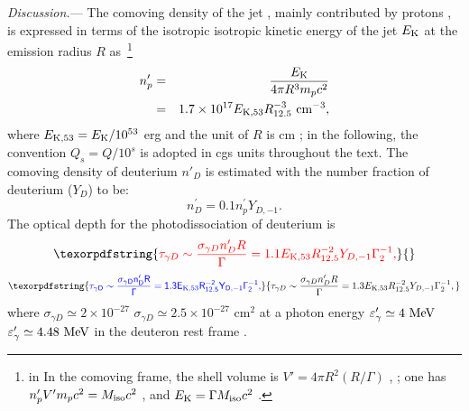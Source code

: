 \documentclass[linenumbers,twocolumn]{aastex631}
\providecommand{\DIFaddtex}[1]{{\protect\color{blue} \sf #1}} %
\providecommand{\DIFdeltex}[1]{{\protect\color{red} \scriptsize #1}} %
\providecommand{\DIFaddbegin}{} %
\providecommand{\DIFaddend}{} %
\providecommand{\DIFdelbegin}{} %
\providecommand{\DIFdelend}{} %
\providecommand{\DIFadd}[1]{\texorpdfstring{\DIFaddtex{#1}}{#1}} %
\providecommand{\DIFdel}[1]{\texorpdfstring{\DIFdeltex{#1}}{}} %
\begin{document}
\textit{Discussion.}--- The comoving density of the jet\DIFaddbegin \DIFadd{, }\DIFaddend mainly contributed by protons\DIFaddbegin \DIFadd{, }\DIFaddend is expressed in terms of the isotropic \DIFdelbegin \DIFdel{isotropic }\DIFdelend kinetic energy of the jet $E_{\rm K}$ at the emission radius $R$ as~\footnote{\DIFdelbegin \DIFdel{in }\DIFdelend \DIFaddbegin \DIFadd{In }\DIFaddend the comoving frame, the shell volume is $V'=4\pi R^2 (R/\Gamma)$\DIFdelbegin \DIFdel{, }\DIFdelend \DIFaddbegin \DIFadd{; }\DIFaddend one has $n^{\prime}_{p}V'm_pc^2=M_{\rm iso}c^2$ \DIFdelbegin \DIFdel{, }\DIFdelend \DIFaddbegin \DIFadd{and }\DIFaddend $E_{\rm K}=\Gamma M_{\rm iso} c^2$\DIFaddbegin \DIFadd{.}\DIFaddend }
\begin{eqnarray}\label{eq:nbp}
 n^{\prime}_{p}&=&\frac{E_{\rm K}}{4\pi R^3 m_p c^2}\nonumber\\
     &=&1.7\times 10^{17} E_{\rm K,53} R_{12.5}^{-3} \ \rm cm^{-3} , \nonumber\\
\end{eqnarray}
where $E_{\rm K,53}=E_{\rm K}/10^{53}$ erg and the unit of $R$ is cm\DIFdelbegin \DIFdel{; in the following, the convention $Q_s = Q/10^s$ is adopted in cgs units throughout the text}\DIFdelend . The comoving density of deuterium $n'_{D}$ is estimated with the number fraction of deuterium ($Y_{D}$) to be:
\begin{equation}\label{eq:nDp}
   n^{\prime}_{ D}= 0.1 n^{\prime}_{p} Y_{D,-1}.
\end{equation}
The optical depth for the photodissociation of deuterium is 
\DIFdelbegin \begin{displaymath}
  \DIFdel{\tau_{\gamma D}\sim\frac{\sigma_{\gamma D} n'_ D R}{\Gamma}=1.1 E_{\rm K, 53} R_{12.5}^{-2} Y_{D,-1} \Gamma_2^{-1},
}\end{displaymath}%
\DIFdelend \DIFaddbegin \begin{equation}
  \DIFadd{\tau_{\gamma D}\sim\frac{\sigma_{\gamma D} n'_ D R}{\Gamma}=1.3 E_{\rm K, 53} R_{12.5}^{-2} Y_{D,-1} \Gamma_2^{-1},
}\end{equation}\DIFaddend 
where \DIFdelbegin \DIFdel{$\sigma_{\gamma D}\simeq 2\times10^{-27}$ }\DIFdelend \DIFaddbegin \DIFadd{$\sigma_{\gamma D}\simeq 2.5\times10^{-27}$ }\DIFaddend cm$^{2}$ at a photon energy
\DIFdelbegin \DIFdel{$\varepsilon'_\gamma \simeq 4~{\rm MeV}$ }\DIFdelend \DIFaddbegin \DIFadd{$\varepsilon'_\gamma \simeq 4.48~{\rm MeV}$ }\DIFaddend in the deuteron rest frame \citep{IAEA2000}.
\end{document}
